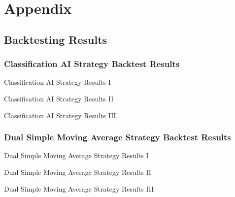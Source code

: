 \section{Appendix}

\subsection{Backtesting Results}
\label{chap:backtest-results}

\subsubsection{Classification AI Strategy Backtest Results}

\cleardoublepage
\begin{table}[H]
    \centering
    \caption{Classification AI Strategy Results I}
\end{table}
\begin{table}[H]
    \centering
    \caption{Classification AI Strategy Results II}
\end{table}
\begin{table}[H]
    \centering
    \caption{Classification AI Strategy Results III}
\end{table}

\subsubsection{Dual Simple Moving Average Strategy Backtest Results}

\begin{table}[H]
    \centering
    \caption{Dual Simple Moving Average Strategy Results I}
\end{table}
\begin{table}[H]
    \centering
    \caption{Dual Simple Moving Average Strategy Results II}
\end{table}
\begin{table}[H]
    \centering
    \caption{Dual Simple Moving Average Strategy Results III}
\end{table}

